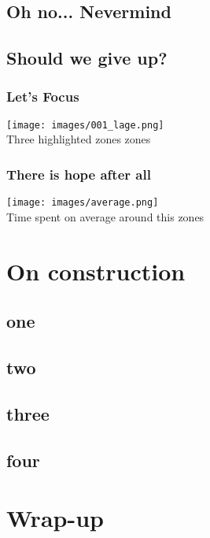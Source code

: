 \documentclass{beamer}
\begin{document}
  \subsection{Oh no... Nevermind}


  \subsection{Should we give up?}
  \begin{frame}
    \frametitle{Let's Focus}
    \begin{center}
    \texttt{[image: images/001\_lage.png]}\\
    \tiny{Three highlighted zones zones}
  \end{center}
  \end{frame}

\begin{frame}
  \frametitle{There is hope after all}
  \begin{center}
  \texttt{[image: images/average.png]}\\
  \tiny{Time spent on average around this zones}
\end{center}
\end{frame}

\section{On construction}
\subsection{one}
\subsection{two}
\subsection{three}
\subsection{four}

\section{Wrap-up}
\end{document}
